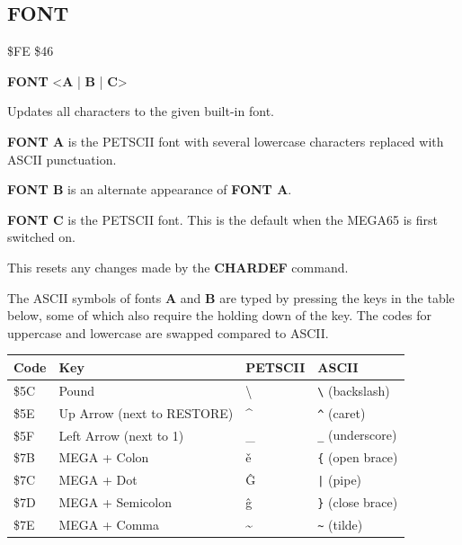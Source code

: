 \subsection{FONT}
\begin{description}[leftmargin=2cm,style=nextline]
\item [Token:]    \$FE \$46
\item [Format:]   {\bf FONT} <{\bf A} | {\bf B} | {\bf C}>
\item [Usage:]    Updates all characters to the given built-in font.

                  {\bf FONT A} is the PETSCII font with several lowercase characters replaced with ASCII punctuation.

                  {\bf FONT B} is an alternate appearance of {\bf FONT A}.

                  {\bf FONT C} is the PETSCII font. This is the default when the MEGA65 is first switched on.

                  This resets any changes made by the {\bf CHARDEF} command.

                  The ASCII symbols of fonts {\bf A} and {\bf B} are typed by pressing the keys in the table below, some of which also require the holding down of the \megasymbolkey key. The codes for uppercase and lowercase are swapped compared to ASCII.

                  \begin{center}
                  {\setlength{\tabcolsep}{1mm}
                  \begin{tabular}{|C{1cm}|L{4.5cm}|C{1.4cm}|L{2.3cm}|}
                  \hline
                  {\bf Code}  & {\bf Key} & {\bf PETSCII} & {\bf ASCII}  \\
                  \hline
                     \$5C & Pound      & {\codefont \textbackslash}   & {\tt \textbackslash} (backslash) \\
                     \$5E & Up Arrow (next to RESTORE)  & {\codefont \textasciicircum} & {\tt \textasciicircum} (caret) \\
                     \$5F & Left Arrow (next to 1)      & {\codefont \_}               & {\tt \_} (underscore)   \\
                     \$7B & MEGA + Colon                & {\codefont ě }               & {\tt \{} (open brace)   \\
                     \$7C & MEGA + Dot                  & {\codefont Ĝ }               & {\tt |} (pipe)  \\
                     \$7D & MEGA + Semicolon            & {\codefont ĝ }               & {\tt \}} (close brace)  \\
                     \$7E & MEGA + Comma                & {\codefont \textasciitilde}  & {\tt \textasciitilde} (tilde)   \\
                  \hline
                  \end{tabular}
                  }
                  \end{center}


\end{description}
